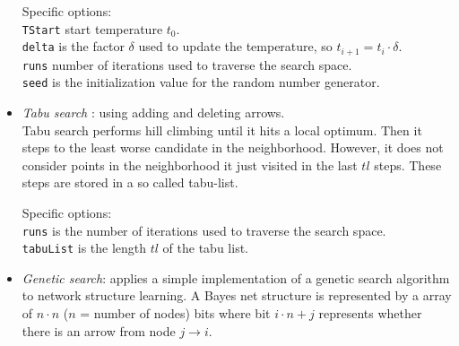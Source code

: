 \documentclass[a4paper]{article}
\begin{document}
\begin{itemize}
\begin{center}
\end{center}

Specific options:\\
{\tt TStart} start temperature $t_0$.\\
{\tt delta} is the factor $\delta$ used to update the temperature, so $t_{i+1}=t_i \cdot \delta$.\\
{\tt runs} number of iterations used to traverse the search space.\\
{\tt seed} is the initialization value for the random number generator.\\

\item \textit{Tabu search} \cite{bouck1995}:
using adding and deleting arrows.\\
Tabu search performs hill climbing until it hits a local optimum.
Then it steps to the least worse candidate in the neighborhood. However,
it does not consider points in the neighborhood it just visited in the
last $tl$ steps. These steps are stored in a so called tabu-list.

\begin{center}
\end{center}

Specific options: \\
{\tt runs} is the number of iterations used to traverse the search space.\\
{\tt tabuList} is the length $tl$ of the tabu list.

\item \textit{Genetic search}: applies a simple implementation of a genetic search algorithm
to network structure learning. A Bayes net structure is represented by a array
of $n\cdot n$ ($n$ = number of nodes) bits where bit $i\cdot n + j$ represents whether
there is an arrow from node $j\to i$.\\

\begin{center}
\end{center}


\end{itemize}
\end{document}
